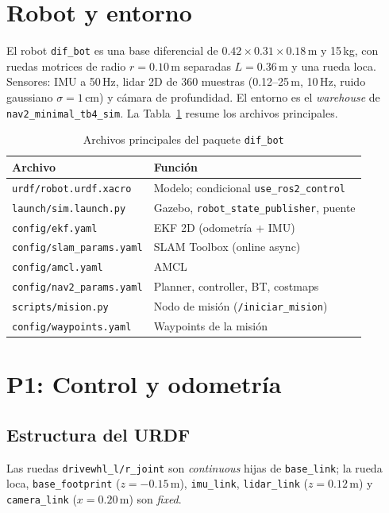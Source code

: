 \documentclass[conference,a4paper]{IEEEtran}
\begin{document}
\section{Robot y entorno}
El robot \texttt{dif\_bot} es una base diferencial de $0.42\times0.31\times0.18$\,m y 15\,kg, con ruedas motrices de radio $r=0.10$\,m separadas $L=0.36$\,m y una rueda loca. Sensores: IMU a 50\,Hz, lidar 2D de 360 muestras (0.12--25\,m, 10\,Hz, ruido gaussiano $\sigma=1$\,cm) y cámara de profundidad. El entorno es el \emph{warehouse} de \texttt{nav2\_minimal\_tb4\_sim}. La Tabla~\ref{tab:archivos} resume los archivos principales.

\begin{table}[!t]\centering\footnotesize
\caption{Archivos principales del paquete \texttt{dif\_bot}}\label{tab:archivos}
\begin{tabularx}{\columnwidth}{lX}\toprule
Archivo & Función \\\midrule
\texttt{urdf/robot.urdf.xacro} & Modelo; condicional \texttt{use\_ros2\_control} \\
\texttt{launch/sim.launch.py} & Gazebo, \texttt{robot\_state\_publisher}, puente \\
\texttt{config/ekf.yaml} & EKF 2D (odometría + IMU) \\
\texttt{config/slam\_params.yaml} & SLAM Toolbox (online async) \\
\texttt{config/amcl.yaml} & AMCL \\
\texttt{config/nav2\_params.yaml} & Planner, controller, BT, costmaps \\
\texttt{scripts/mision.py} & Nodo de misión (\texttt{/iniciar\_mision}) \\
\texttt{config/waypoints.yaml} & Waypoints de la misión \\\bottomrule
\end{tabularx}
\end{table}

\section{P1: Control y odometría}
\subsection{Estructura del URDF}
Las ruedas \texttt{drivewhl\_l/r\_joint} son \emph{continuous} hijas de \texttt{base\_link}; la rueda loca, \texttt{base\_footprint} ($z=-0.15$\,m), \texttt{imu\_link}, \texttt{lidar\_link} ($z=0.12$\,m) y \texttt{camera\_link} ($x=0.20$\,m) son \emph{fixed}.
\end{document}
